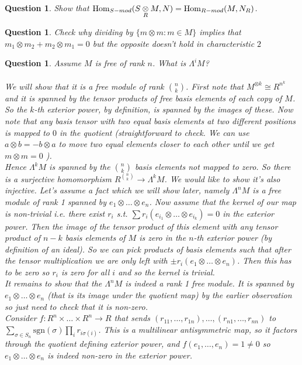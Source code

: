 \documentclass[a4paper]{article}
\newtheorem{que}[thm]{Question}
\begin{document}
\begin{que} Show that $\operatorname{Hom}_{S-mod}(S \mathbin{\mathop{\otimes}\limits_{R}} M, N) = \operatorname{Hom}_{R-mod}(M, N_R)$.
\end{que}
\begin{que} Check why dividing by $\{m \otimes m : m \in M\}$ implies that $m_1 \otimes m_2 + m_2 \otimes m_1 = 0$ but the opposite doesn't hold in characteristic $2$
\end{que}
\begin{que} Assume $M$ is free of rank $n$. What is $\Lambda^i M$?\\\\
    We will show that it is a free module of rank $\binom{n}{k}$. First note that $M^{\otimes k}\cong R^{n^{k}}$ and it is spanned by the tensor products of free basis elements of each copy of $M$. So the $k$-th exterior power, by definition, is spanned by the images of these. Now note that any basis tensor with two equal basis elements at two different positions is mapped to $0$ in the quotient (straightforward to check. We can use $a\otimes b=-b\otimes a$ to move two equal elements closer to each other until we get $m\otimes m=0$ ).\\
    Hence $\Lambda^{k}M$ is spanned by the $\binom{n}{k}$ basis elements not mapped to zero. So there is a surjective homomorphism $R^{\binom{n}{k}}\to \Lambda^{k}M$. We would like to show it's also injective. Let's assume a fact which we will show later, namely $\Lambda^{n}M$ is a free module of rank 1 spanned by $e_1\otimes \ldots\otimes e_n$. Now assume that the kernel of our map is non-trivial i.e. there exist $r_i$ s.t. $\sum r_i (e_{i_1}\otimes \ldots\otimes e_{i_k})=0$ in the exterior power. Then the image of the tensor product of this element with any tensor product of $n-k$ basis elements of $M$ is zero in the  $n$-th exterior power (by definition of an ideal). So we can pick products of basis elements such that after the tensor multiplication we are only left with  $\pm r_i \left( e_1 \otimes \ldots \otimes e_n \right) $. Then this has to be zero so $r_i$ is zero for all $i$ and so the kernel is trivial.\\
    It remains to show that the $\Lambda^{n}M$ is indeed a rank 1 free module. It is spanned by $e_1\otimes \ldots\otimes e_n$ (that is its image under the quotient map) by the earlier observation so just need to check that it is non-zero. \\Consider $f:R^{n}\times \ldots\times R^{n}\to R$ that sends $\left( r_{11},\ldots,r_{1n} \right),\ldots,\left(r_{n1},\ldots,r_{nn}\right) $ to $\sum_{\sigma\in S_n}\text{sgn}\left( \sigma \right) \prod_{i} r_{i\sigma\left( i \right) }$. This is a multilinear antisymmetric map, so it factors through the quotient defining exterior power, and $f(e_1,\ldots , e_n ) = 1\neq 0$ so $e_1\otimes \ldots\otimes e_n$ is indeed non-zero in the exterior power.
\end{que}
\end{document}
